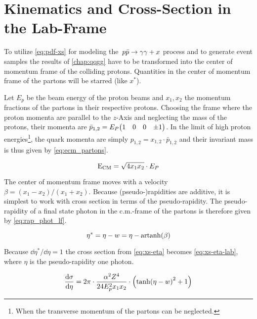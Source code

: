 \section{Kinematics and Cross-Section in the Lab-Frame}%
\label{sec:lab_xs}

To utilize \cref{eq:pdf-xs} for modeling the~\(p\bar{p}\rightarrow\gamma\gamma + x\) process and to
generate event samples the results of \cref{chap:qqgg} have to be
transformed into the center of momentum frame of the colliding
protons. Quantities in the center of momentum frame of the partons
will be starred (like \(x^\ast\)).

Let \(E_p\) be the beam energy of the proton beams and \(x_1, x_2\)
the momentum fractions of the partons in their respective protons.
Choosing the frame where the proton momenta are parallel to the
\(z\)-Axis and neglecting the mass of the protons, their momenta are
\(\bar{p}_{1,2} = E_P \mqty(1 & 0 & 0 & \pm1)\). In the limit of high
proton energies\footnote{When the transverse momentum of the partons
  can be neglected.}, the quark momenta are simply
\(p_{1,2}=x_{1,2}\cdot\bar{p}_{1,2}\) and their invariant mass is thus
given by \cref{eq:ecm_partons}.

\begin{equation}
  \label{eq:ecm_partons}
  \operatorname{E_{\text{CM}}} = \sqrt{4x_1x_2}\cdot E_P
\end{equation}

The center of momentum frame moves with a velocity
\(\beta = (x_1-x_2)/(x_1+x_2)\). Because (pseudo-)rapidities are
additive, it is simplest to work with cross section in terms of the
pseudo-rapidity.  The pseudo-rapidity of a final state photon in the
c.m.-frame of the partons is therefore given
by \cref{eq:rap_phot_lf}.

\begin{equation}
  \label{eq:rap_phot_lf}
  \eta^\ast = \eta - w = \eta - \operatorname{artanh}(\beta)
\end{equation}

Because \(\dd{\eta^\ast}/{\dd{\eta}} = 1\) the cross section
from \cref{eq:xs-eta} becomes \cref{eq:xs-eta-lab}, where \(\eta\) is
the pseudo-rapidity one photon.

\begin{equation}
  \label{eq:xs-eta-lab}
  \dv{\sigma}{\eta} = 2\pi\cdot\frac{\alpha^2Z^4}{24 E_p^2
    x_1x_2}\cdot\qty(\tanh(\eta - w)^2 + 1)
\end{equation}

